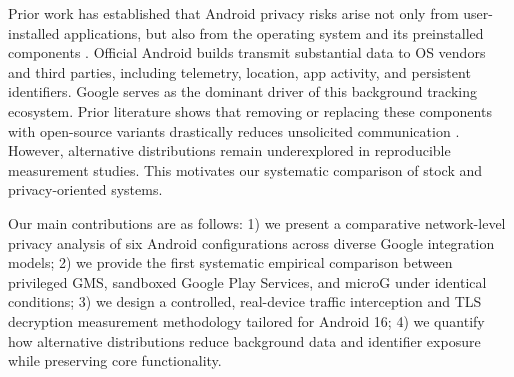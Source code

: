 Prior work has established that Android privacy risks arise not only from user-installed applications, but also from the operating system and its preinstalled components \cite{android-os-snooping2021,android-os-snooping2023,google-dialer-messages,cookies-identifiers2025,google-data-collection2018}. Official Android builds transmit substantial data to OS vendors and third parties, including telemetry, location, app activity, and persistent identifiers. Google serves as the dominant driver of this background tracking ecosystem. Prior literature shows that removing or replacing these components with open-source variants drastically reduces unsolicited communication \cite{android-os-snooping2021}. However, alternative distributions remain underexplored in reproducible measurement studies. This motivates our systematic comparison of stock and privacy-oriented systems.

Our main contributions are as follows: 1) we present a comparative network-level privacy analysis of six Android configurations across diverse Google integration models; 2) we provide the first systematic empirical comparison between privileged GMS, sandboxed Google Play Services, and microG under identical conditions; 3) we design a controlled, real-device traffic interception and TLS decryption measurement methodology tailored for Android 16; 4) we quantify how alternative distributions reduce background data and identifier exposure while preserving core functionality.
